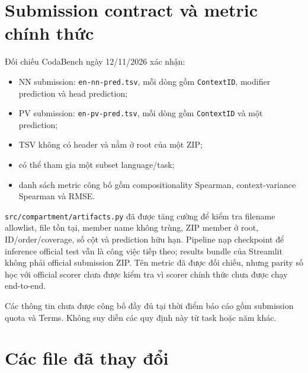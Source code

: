 \documentclass[11pt,a4paper]{article}
\newcommand{\code}[1]{\nolinkurl{#1}}
\begin{document}
\section{Submission contract và metric chính thức}

Đối chiếu CodaBench ngày 12/11/2026 xác nhận:
\begin{itemize}
  \item NN submission: \code{en-nn-pred.tsv}, mỗi dòng gồm \code{ContextID}, modifier prediction và head prediction;
  \item PV submission: \code{en-pv-pred.tsv}, mỗi dòng gồm \code{ContextID} và một prediction;
  \item TSV không có header và nằm ở root của một ZIP;
  \item có thể tham gia một subset language/task;
  \item danh sách metric công bố gồm compositionality Spearman, context-variance Spearman và RMSE.
\end{itemize}

\code{src/compartment/artifacts.py} đã được tăng cường để kiểm tra filename allowlist, file tồn tại, member name không trùng, ZIP member ở root, ID/order/coverage, số cột và prediction hữu hạn. Pipeline nạp checkpoint để inference official test vẫn là công việc tiếp theo; results bundle của Streamlit không phải official submission ZIP. Tên metric đã được đối chiếu, nhưng parity số học với official scorer chưa được kiểm tra vì scorer chính thức chưa được chạy end-to-end.

Các thông tin chưa được công bố đầy đủ tại thời điểm báo cáo gồm submission quota và Terms. Không suy diễn các quy định này từ task hoặc năm khác.

\section{Các file đã thay đổi}
\end{document}
